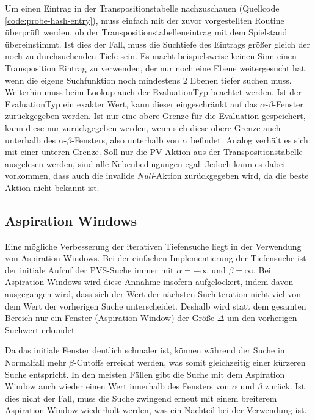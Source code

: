 Um einen Eintrag in der Transpositionstabelle nachzuschauen (Quellcode \ref{code:probe-hash-entry}), muss einfach mit der zuvor vorgestellten Routine überprüft werden, ob der Transpositionstabelleneintrag mit dem Spielstand übereinstimmt. Ist dies der Fall, muss die Suchtiefe des Eintrags größer gleich der noch zu durchsuchenden Tiefe sein. Es macht beispielsweise keinen Sinn einen Transposition Eintrag zu verwenden, der nur noch eine Ebene weitergesucht hat, wenn die eigene Suchfunktion noch mindestens 2 Ebenen tiefer suchen muss. Weiterhin muss beim Lookup auch der EvaluationTyp beachtet werden. Ist der EvaluationTyp ein exakter Wert, kann dieser eingeschränkt auf das $\alpha$-$\beta$-Fenster zurückgegeben werden. Ist nur eine obere Grenze für die Evaluation gespeichert, kann diese nur zurückgegeben werden, wenn sich diese obere Grenze auch unterhalb des $\alpha$-$\beta$-Fensters, also unterhalb von $\alpha$ befindet. Analog verhält es sich mit einer unteren Grenze. Soll nur die \ac{PV}-Aktion aus der Transpositionstabelle ausgelesen werden, sind alle Nebenbedingungen egal. Jedoch kann es dabei vorkommen, dass auch die invalide \emph{Null}-Aktion zurückgegeben wird, da die beste Aktion nicht bekannt ist.

\pagebreak



\pagebreak

\subsection{Aspiration Windows}

Eine mögliche Verbesserung der iterativen Tiefensuche liegt in der Verwendung von Aspiration Windows. Bei der einfachen Implementierung der Tiefensuche ist der initiale Aufruf der \ac{PVS}-Suche immer mit $\alpha = -\infty$ und $\beta = \infty$. Bei Aspiration Windows wird diese Annahme insofern aufgelockert, indem davon ausgegangen wird, dass sich der Wert der nächsten Suchiteration nicht viel von dem Wert der vorherigen Suche unterscheidet. Deshalb wird statt dem gesamten Bereich nur ein Fenster (Aspiration Window) der Größe $\Delta$ um den vorherigen Suchwert erkundet. \cite{2003.AspirationWindows}

Da das initiale Fenster deutlich schmaler ist, können während der Suche im Normalfall mehr $\beta$-Cutoffs erreicht werden, was somit gleichzeitig einer kürzeren Suche entspricht. In den meisten Fällen gibt die Suche mit dem Aspiration Window auch wieder einen Wert innerhalb des Fensters von $\alpha$ und $\beta$ zurück. Ist dies nicht der Fall, muss die Suche zwingend erneut mit einem breiterem Aspiration Window wiederholt werden, was ein Nachteil bei der Verwendung ist.

